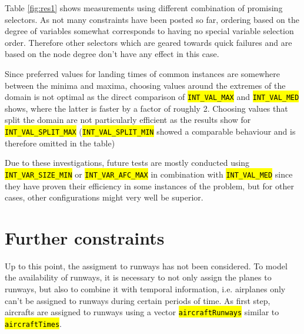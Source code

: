 \documentclass[,%
			paper=a4,%
			DIV12,
			liststotoc,
			bibtotoc,
			draft=false,%
			numbers=noendperiod
			]{scrartcl}
\newcommand{\ilc}[1]{\hl{\texttt{#1}}}
\begin{document}
Table \ref{fig:res1} shows measurements using different combination of promising selectors.
As not many constraints have been posted so far, ordering based on the degree of variables somewhat corresponds to having no special variable selection order. Therefore other selectors which are geared towards quick failures and are based on the node degree don't have any effect in this case.

Since preferred values for landing times of common instances are somewhere between the minima and maxima, choosing values around the extremes of the domain is not optimal as the direct comparison of \ilc{INT\_VAL\_MAX} and \ilc{INT\_VAL\_MED} shows, where the latter is faster by a factor of roughly 2.
Choosing values that split the domain are not particularly efficient as the results show for \ilc{INT\_VAL\_SPLIT\_MAX} (\ilc{INT\_VAL\_SPLIT\_MIN} showed a comparable behaviour and is therefore omitted in the table)

Due to these investigations, future tests are mostly conducted using \ilc{INT\_VAR\_SIZE\_MIN} or \ilc{INT\_VAR\_AFC\_MAX} in combination with \ilc{INT\_VAL\_MED} since they have proven their efficiency in some instances of the problem, but for other cases, other configurations might very well be superior.

\section{Further constraints}

\marginnote{\Crunway}
Up to this point, the assigment to runways has not been considered. 
To model the availability of runways, it is necessary to not only assign the planes to runways, but also to combine it with temporal information, i.e. airplanes only can't be assigned to runways during certain periods of time.
As first step, aircrafts are assigned to runways using a vector \ilc{aircraftRunways} similar to \ilc{aircraftTimes}. 
 
\end{document}
